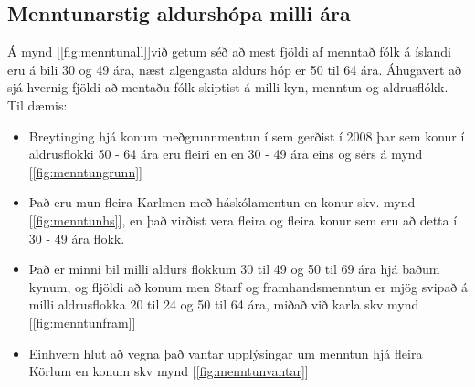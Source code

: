 \documentclass[12pt, git, draft]{rureport}
\begin{document}
\subsection{Menntunarstig aldurshópa milli ára}
Á mynd [\ref{fig:menntunall}]við getum séð að mest fjöldi af menntað fólk á íslandi eru á bili 30 og 49 ára, næst algengasta aldurs hóp er 50 til 64 ára.
Áhugavert að sjá hvernig fjöldi að mentaðu fólk skiptist á milli kyn, menntun og aldrusflókk. Til dæmis:
\begin{itemize}  
	
	\item Breytinging hjá konum meðgrunnmentun í sem gerðist í  2008 þar sem konur í aldrusflokki 50 - 64 ára eru fleiri en  en 30 - 49 ára eins og sérs á mynd [\ref{fig:menntungrunn}]
	
	\item Það eru mun fleira Karlmen með háskólamentun en konur skv. mynd [\ref{fig:menntunhs}], en það virðist vera fleira og fleira konur sem eru að detta í 30 - 49 ára flokk.
	
	\item Það er minni bil milli aldurs flokkum 30 til 49 og 50 til 69 ára hjá baðum kynum,
	og fljöldi að konum men Starf og framhandsmenntun er mjög svipað á milli aldrusflokka 20 til 24 og 50 til 64 ára, miðað við karla skv mynd [\ref{fig:menntunfram}] 
	
	\item Einhvern hlut að vegna það vantar upplýsingar um menntun hjá fleira Körlum en konum skv mynd [\ref{fig:menntunvantar}]
	
\end{itemize}

\end{document}

